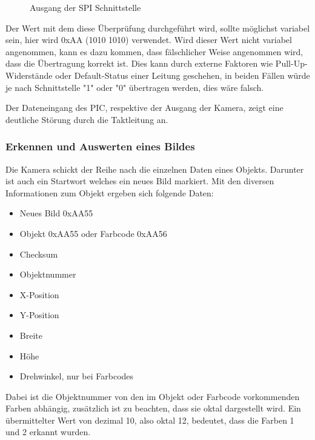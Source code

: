     \begin{figure}[tbh]
      \begin{centering}
      \par\end{centering}
      \caption{Ausgang der SPI Schnittstelle}
      \label{SPI-Ausgang}
    \end{figure}

    Der Wert mit dem diese Überprüfung durchgeführt wird, sollte möglichst variabel sein, hier wird 0xAA (1010 1010) verwendet.
    Wird dieser Wert nicht variabel angenommen, kann es dazu kommen, dass fälschlicher Weise angenommen wird, dass die Übertragung korrekt ist. Dies kann durch externe Faktoren wie
    Pull-Up-Widerstände oder Default-Status einer Leitung geschehen, in beiden Fällen würde je nach Schnittstelle "1" oder "0" übertragen werden, dies wäre falsch.

    Der Dateneingang des PIC, respektive der Ausgang der Kamera, zeigt eine deutliche Störung durch die Taktleitung an.

    \subsubsection{Erkennen und Auswerten eines Bildes}
    Die Kamera schickt der Reihe nach die einzelnen Daten eines Objekts. Darunter ist auch ein Startwort welches ein neues Bild markiert.
    Mit den diversen Informationen zum Objekt ergeben sich folgende Daten:
    \begin{itemize}
      \item Neues Bild 0xAA55
      \item Objekt 0xAA55 oder Farbcode 0xAA56
      \item Checksum
      \item Objektnummer
      \item X-Position
      \item Y-Position
      \item Breite
      \item Höhe
      \item Drehwinkel, nur bei Farbcodes
    \end{itemize}
    Dabei ist die Objektnummer von den im Objekt oder Farbcode vorkommenden Farben abhängig, zusätzlich ist zu beachten, dass sie oktal dargestellt wird.
    Ein übermittelter Wert von dezimal 10, also oktal 12, bedeutet, dass die Farben 1 und 2 erkannt wurden.

